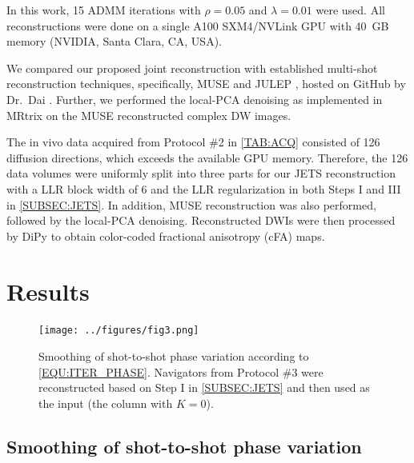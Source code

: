 \documentclass[preprint,12pt,authoryear,review]{elsarticle}
\begin{document}
    In this work, 15 ADMM iterations with $\rho = 0.05$
    and $\lambda = 0.01$ were used.
    All reconstructions were done on a single A100 SXM4/NVLink GPU
    with \SI{40}{GB} memory (NVIDIA, Santa Clara, CA, USA).

    We compared our proposed joint reconstruction
    with established multi-shot reconstruction techniques,
    specifically, MUSE \citep{chen_2013_muse}
    and JULEP \citep{dai_2023_julep},
    hosted on GitHub by Dr.~Dai \citep{dai_2023_julep}.
    Further, we performed
    the local-PCA denoising \citep{cordero_2019_cplxdwi}
    as implemented in MRtrix \citep{Tournier_2019_mrtrix}
    on the MUSE reconstructed complex DW images.

    The in vivo data acquired from Protocol \#2 in \cref{TAB:ACQ}
    consisted of 126 diffusion directions,
    which exceeds the available GPU memory.
    Therefore, the 126 data volumes were uniformly split
    into three parts for our JETS reconstruction
    with a LLR block width of 6 and the LLR regularization
    in both Steps I and III in \cref{SUBSEC:JETS}.
    In addition, MUSE reconstruction was also performed,
    followed by the local-PCA denoising.
    Reconstructed DWIs were then processed
    by DiPy \citep{garyfallidis_2014_dipy}
    to obtain color-coded fractional anisotropy (cFA) maps.

    \pagebreak

    \section{Results}
    \label{SEC_Resl}

    \begin{figure}
        \centering
        \texttt{[image: ../figures/fig3.png]}
        \caption{Smoothing of shot-to-shot phase variation
        according to \cref{EQU:ITER_PHASE}.
        Navigators from Protocol \#3 were reconstructed
        based on Step I in \cref{SUBSEC:JETS}
        and then used as the input (the column with $K = 0$).}
        \label{FIG:iter_phase}
    \end{figure}

    \subsection{Smoothing of shot-to-shot phase variation}
\end{document}
